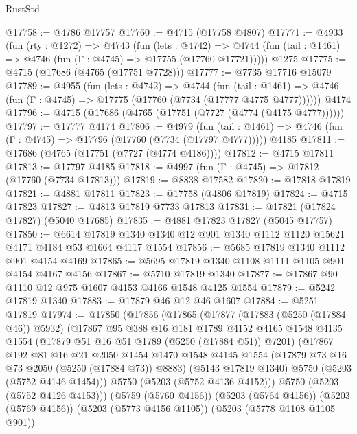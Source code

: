\begin{lexlean}{RustStd}
\begin{coremodule}
@17758 := @4786 @17757
@17760 := @4715 (@17758 @4807)
@17771 := @4933
    (fun (rty : @1272) =>
    @4743
      (fun (lets : @4742) =>
      @4744 (fun (tail : @1461) => @4746 (fun (Γ : @4745) => @17755 (@17760 @17721)))))
    @1275
@17775 := @4715 (@17686 (@4765 (@17751 @7728)))
@17777 := @7735 @17716 @15079
@17789 := @4955
    (fun (lets : @4742) =>
    @4744
      (fun (tail : @1461) =>
      @4746 (fun (Γ : @4745) => @17775 (@17760 (@7734 (@17777 @4775 @4777))))))
    @4174
@17796 := @4715 (@17686 (@4765 (@17751 (@7727 (@4774 (@4175 @4777))))))
@17797 := @17777 @4174
@17806 := @4979
    (fun (tail : @1461) => @4746 (fun (Γ : @4745) => @17796 (@17760 (@7734 (@17797 @4777)))))
    @4185
@17811 := @17686 (@4765 (@17751 (@7727 (@4774 @4186))))
@17812 := @4715 @17811
@17813 := @17797 @4185
@17818 := @4997 (fun (Γ : @4745) => @17812 (@17760 (@7734 @17813)))
@17819 := @8838 @17582
@17820 := @17818 @17819
@17821 := @4881 @17811
@17823 := @17758 (@4806 @17819)
@17824 := @4715 @17823
@17827 := @4813 @17819 @7733 @17813
@17831 := @17821 (@17824 @17827) (@5040 @17685)
@17835 := @4881 @17823 @17827 (@5045 @17757)
@17850 := @6614
    @17819
    @1340
    @1340
    @12
    @901
    @1340
    @1112
    @1120
    @15621
    @4171
    @4184
    @53
    @1664
    @4117
    @1554
@17856 := @5685 @17819 @1340 @1112 @901 @4154 @4169
@17865 := @5695 @17819 @1340 @1108 @1111 @1105 @901 @4154 @4167 @4156
@17867 := @5710 @17819 @1340
@17877 := @17867 @90 @1110 @12 @975 @1607 @4153 @4166 @1548 @4125 @1554
@17879 := @5242 @17819 @1340
@17883 := @17879 @46 @12 @46 @1607
@17884 := @5251 @17819
@17974 := @17850
    (@17856
      (@17865
        (@17877
          (@17883 (@5250 (@17884 @46)) @5932)
          (@17867
            @95
            @388
            @16
            @181
            @1789
            @4152
            @4165
            @1548
            @4135
            @1554
            (@17879 @51 @16 @51 @1789 (@5250 (@17884 @51)) @7201)
            (@17867
              @192
              @81
              @16
              @21
              @2050
              @1454
              @1470
              @1548
              @4145
              @1554
              (@17879 @73 @16 @73 @2050 (@5250 (@17884 @73)) @8883)
              (@5143 @17819 @1340)
              @5750
              (@5203 (@5752 @4146 @1454)))
            @5750
            (@5203 (@5752 @4136 @4152)))
          @5750
          (@5203 (@5752 @4126 @4153)))
        (@5759 (@5760 @4156))
        (@5203 (@5764 @4156))
        (@5203 (@5769 @4156))
        (@5203 (@5773 @4156 @1105))
        (@5203 (@5778 @1108 @1105 @901))

\end{coremodule}
\end{lexlean}
